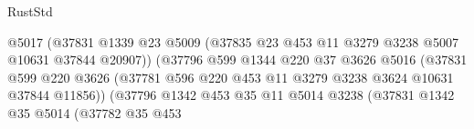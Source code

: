 \begin{lexlean}{RustStd}
\begin{coremodule}
{\begin{coremodule}
{{{{{{{{{{{{{{{{{{{{{{{{{{                                          @5017
                                          (@37831
                                            @1339
                                            @23
                                            @5009
                                            (@37835
                                              @23
                                              @453
                                              @11
                                              @3279
                                              @3238
                                              @5007
                                              @10631
                                              @37844
                                              @20907))
                                          (@37796
                                            @599
                                            @1344
                                            @220
                                            @37
                                            @3626
                                            @5016
                                            (@37831
                                              @599
                                              @220
                                              @3626
                                              (@37781
                                                @596
                                                @220
                                                @453
                                                @11
                                                @3279
                                                @3238
                                                @3624
                                                @10631
                                                @37844
                                                @11856))
                                            (@37796
                                              @1342
                                              @453
                                              @35
                                              @11
                                              @5014
                                              @3238
                                              (@37831
                                                @1342
                                                @35
                                                @5014
                                                (@37782
                                                  @35
                                                  @453
}}}}}}}}}}}}}}}}}}}}}}}}}}
\end{coremodule}}
\end{coremodule}
\end{lexlean}
